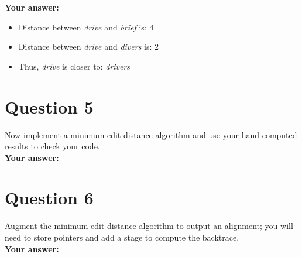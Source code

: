 \documentclass[a4paper]{article}
\begin{document}
\textbf{Your answer:}
\begin{itemize}
\item Distance between \textit{drive} and \textit{brief} is: 4
\item Distance between \textit{drive} and \textit{divers} is: 2
\item Thus, \textit{drive} is closer to: \textit{drivers}
\end{itemize}

\section{Question 5}
Now implement a minimum edit distance algorithm and use your hand-computed results to check your code.\\

\textbf{Your answer:}



\section{Question 6}
Augment the minimum edit distance algorithm to output an alignment; you will need to store pointers and add a stage to compute the backtrace.\\

\textbf{Your answer:}



\clearpage
\end{document}
